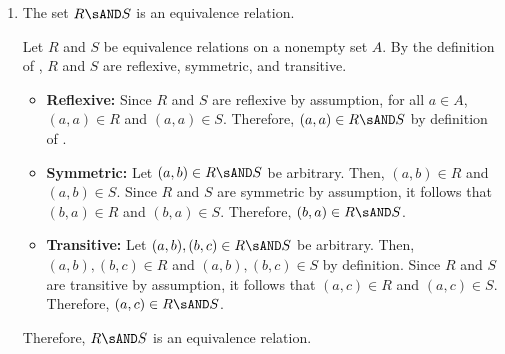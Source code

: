 \begin{enumerate}
\begin{enumerate}
\begin{subdisprove}
\begin{center}
        \hspace{1cm}
        \end{center}
      \end{subdisprove}
    \item The set $R \sAND S$ is an equivalence relation.
      \begin{subprove}
        Let $R$ and $S$ be equivalence relations on a nonempty set $A$. 
        By the definition of ,
        $R$ and $S$ are reflexive, symmetric, and transitive.
        \begin{itemize}
          \item \textbf{Reflexive:} Since $R$ and $S$ are reflexive by assumption, 
          for all $a \in A$, $(a,a) \in R$ and $(a,a) \in S$. 
          Therefore, $(a,a) \in R \sAND S$ by definition of .
          \item \textbf{Symmetric:} Let $(a,b) \in R \sAND S$ be arbitrary. 
          Then, $(a,b) \in R$ and $(a,b) \in S$. 
          Since $R$ and $S$ are symmetric by assumption, 
          it follows that $(b,a) \in R$ and $(b,a) \in S$. 
          Therefore, $(b,a) \in R \sAND S$.
          \item \textbf{Transitive:} 
          Let $(a,b), (b,c) \in R \sAND S$ be arbitrary. 
          Then, $(a,b), (b,c) \in R$ and $(a,b), (b,c) \in S$ by definition. 
          Since $R$ and $S$ are transitive by assumption, 
          it follows that $(a,c) \in R$ and $(a,c) \in S$. 
          Therefore, $(a,c) \in R \sAND S$.
        \end{itemize}
        Therefore, $R \sAND S$ is an equivalence relation.
      \end{subprove}
  \end{enumerate}










\end{enumerate}
